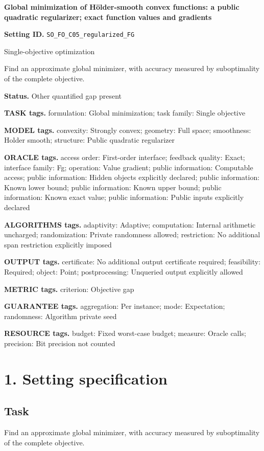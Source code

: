 \documentclass[10pt,a4paper]{article}
\begin{document}
\raggedright

{\LARGE\bfseries\sffamily\color{AtlasNavy} Global minimization of Hölder-smooth convex functions: a public quadratic regularizer; exact function values and gradients\par}\vspace{5pt}
\textbf{Setting ID.} \texttt{SO\_\allowbreak{}FO\_\allowbreak{}C05\_\allowbreak{}regularized\_\allowbreak{}FG}

Single-objective optimization

Find an approximate global minimizer, with accuracy measured by suboptimality of the complete objective.

\textbf{Status.} Other quantified gap present

\textbf{TASK tags.} formulation: Global minimization; task family: Single objective

\textbf{MODEL tags.} convexity: Strongly convex; geometry: Full space; smoothness: Holder smooth; structure: Public quadratic regularizer

\textbf{ORACLE tags.} access order: First-order interface; feedback quality: Exact; interface family: Fg; operation: Value gradient; public information: Computable access; public information: Hidden objects explicitly declared; public information: Known lower bound; public information: Known upper bound; public information: Known exact value; public information: Public inputs explicitly declared

\textbf{ALGORITHMS tags.} adaptivity: Adaptive; computation: Internal arithmetic uncharged; randomization: Private randomness allowed; restriction: No additional span restriction explicitly imposed

\textbf{OUTPUT tags.} certificate: No additional output certificate required; feasibility: Required; object: Point; postprocessing: Unqueried output explicitly allowed

\textbf{METRIC tags.} criterion: Objective gap

\textbf{GUARANTEE tags.} aggregation: Per instance; mode: Expectation; randomness: Algorithm private seed

\textbf{RESOURCE tags.} budget: Fixed worst-case budget; measure: Oracle calls; precision: Bit precision not counted

\section{1. Setting specification}
\subsection{Task}
Find an approximate global minimizer, with accuracy measured by suboptimality of the complete objective.
\end{document}
